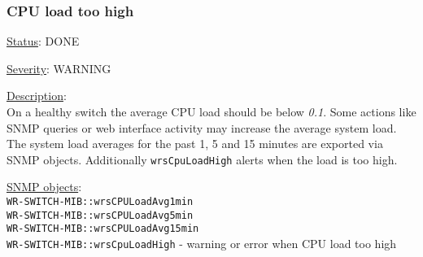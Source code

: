\subsubsection{\bf CPU load too high}
		\label{fail:other:cpu}
		\begin{packed_enum}
			\item [] \underline{Status}: DONE
			\item [] \underline{Severity}: WARNING
			\item [] \underline{Description}:\\
				On a healthy switch the average CPU load should be below \emph{0.1}.
				Some actions like SNMP queries or web interface activity may increase
				the average system load. The system load averages for the past 1, 5 and
				15 minutes are exported via SNMP objects. Additionally
				\texttt{wrsCpuLoadHigh} alerts when the load is too high.
			\item [] \underline{SNMP objects}:\\
				\texttt{WR-SWITCH-MIB::wrsCPULoadAvg1min}\\
				\texttt{WR-SWITCH-MIB::wrsCPULoadAvg5min}\\
				\texttt{WR-SWITCH-MIB::wrsCPULoadAvg15min}\\
				\texttt{WR-SWITCH-MIB::wrsCpuLoadHigh} - warning or error when CPU load too high
		\end{packed_enum}

